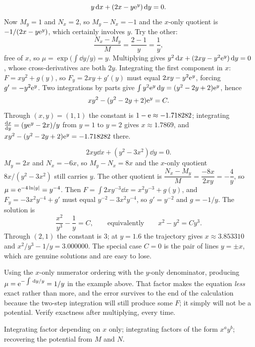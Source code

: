\begin{worked}
\[y\,\mathrm{d} x+(2x-y\mathrm{e}^{y})\,\mathrm{d} y=0.\]
Now $M_y=1$ and $N_x=2$, so $M_y-N_x=-1$ and the $x$-only quotient is $-1/(2x-y\mathrm{e}^{y})$, which certainly involves $y$. Try the other:
\[\frac{N_x-M_y}{M}=\frac{2-1}{y}=\frac1y,\]
free of $x$, so $\mu=\exp\bigl(\int\dd y/y\bigr)=y$. Multiplying gives $y^{2}\,\mathrm{d} x+(2xy-y^{2}\mathrm{e}^{y})\,\mathrm{d} y=0$, whose cross-derivatives are both $2y$. Integrating the first component in $x$: $F=xy^{2}+g(y)$, so $F_y=2xy+g'(y)$ must equal $2xy-y^{2}\mathrm{e}^{y}$, forcing $g'=-y^{2}\mathrm{e}^{y}$. Two integrations by parts give $\int y^{2}\mathrm{e}^{y}\,\mathrm{d} y=(y^{2}-2y+2)\mathrm{e}^{y}$, hence
\[xy^{2}-(y^{2}-2y+2)\mathrm{e}^{y}=C.\]
Through $(x,y)=(1,1)$ the constant is $1-\mathrm{e}\approx-1.718282$; integrating $\frac{\mathrm{d}x}{\mathrm{d}y}=(y\mathrm{e}^{y}-2x)/y$ from $y=1$ to $y=2$ gives $x\approx1.7869$, and $xy^{2}-(y^{2}-2y+2)\mathrm{e}^{y}=-1.718282$ there.
\end{worked}

\begin{worked}
\[2xy\dd x+(y^{2}-3x^{2})\dd y=0.\]
$M_y=2x$ and $N_x=-6x$, so $M_y-N_x=8x$ and the $x$-only quotient $8x/(y^{2}-3x^{2})$ still carries $y$. The other quotient is $\dfrac{N_x-M_y}{M}=\dfrac{-8x}{2xy}=-\dfrac{4}{y}$, so $\mu=\mathrm{e}^{-4\ln\left\lvert y\right\rvert}=y^{-4}$. Then $F=\int2xy^{-3}\dd x=x^{2}y^{-3}+g(y)$, and $F_y=-3x^{2}y^{-4}+g'$ must equal $y^{-2}-3x^{2}y^{-4}$, so $g'=y^{-2}$ and $g=-1/y$. The solution is
\[\frac{x^{2}}{y^{3}}-\frac{1}{y}=C,\qquad\text{equivalently}\qquad x^{2}-y^{2}=Cy^{3}.\]
Through $(2,1)$ the constant is $3$; at $y=1.6$ the trajectory gives $x\approx3.853310$ and $x^{2}/y^{3}-1/y=3.000000$. The special case $C=0$ is the pair of lines $y=\pm x$, which are genuine solutions and are easy to lose.
\end{worked}

\begin{trap}
Using the $x$-only numerator ordering with the $y$-only denominator, producing $\mu=\mathrm{e}^{-\int\,\mathrm{d} y/y}=1/y$ in the example above. That factor makes the equation \emph{less} exact rather than more, and the error survives to the end of the calculation because the two-step integration will still produce some $F$; it simply will not be a potential. Verify exactness after multiplying, every time.
\end{trap}

\begin{seealsob}Integrating factor depending on $x$ only; integrating factors of the form $x^{a}y^{b}$; recovering the potential from $M$ and $N$.\end{seealsob}

